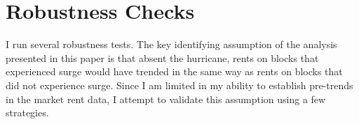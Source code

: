 \documentclass[12pt]{article}
\begin{document}
{{{{{%



\section{Robustness Checks}
I run several robustness tests.  The key identifying assumption of the analysis presented in this paper is that absent the hurricane, rents on blocks that experienced surge would have trended in the same way as rents on blocks that did not experience surge. Since I am limited in my ability to establish pre-trends in the market rent data, I attempt to validate this assumption using a few strategies.

}}}}}
\end{document}
